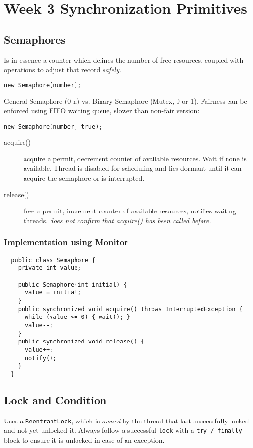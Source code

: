 \section{Week 3 Synchronization Primitives}

\subsection{Semaphores}

Is in essence a counter which defines the number of free resources, coupled with operations to adjust that record \emph{safely}.

\texttt{new Semaphore(number);}

General Semaphore (0-n) vs. Binary Semaphore (Mutex, 0 or 1). Fairness can be enforced using FIFO waiting queue, slower than non-fair version:

\texttt{new Semaphore(number, true);}

\begin{description}
  \item[acquire()] acquire a permit, decrement counter of available resources. Wait if none is available. Thread is disabled for scheduling and lies dormant until it can acquire the semaphore or is interrupted.
  \item[release()] free a permit, increment counter of available resources, notifies waiting threads. \textit{does not confirm that acquire() has been called before.}
\end{description}

\subsubsection*{Implementation using Monitor}
\begin{verbatim}
  public class Semaphore {
    private int value;

    public Semaphore(int initial) {
      value = initial;
    }
    public synchronized void acquire() throws InterruptedException {
      while (value <= 0) { wait(); }
      value--;
    }
    public synchronized void release() {
      value++;
      notify();
    }
  }
\end{verbatim}

\subsection{Lock and Condition}

Uses a \texttt{ReentrantLock}, which is \textit{owned} by the thread that last successfully locked and not yet unlocked it. Always follow a successful \texttt{lock} with a \texttt{try / finally} block to ensure it is unlocked in case of an exception.

